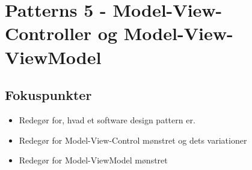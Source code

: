 \section{Patterns 5 - Model-View-Controller og Model-View-ViewModel}

\subsection{Fokuspunkter}

\begin{itemize}
	\item Redegør for, hvad et software design pattern er.
	\item Redegør for Model-View-Control mønstret og dets variationer
	\item Redegør for Model-ViewModel mønstret
\end{itemize}
